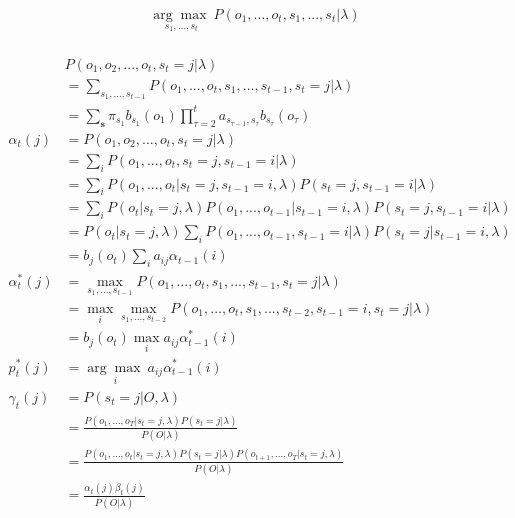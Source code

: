 \documentclass[11pt]{article}
\begin{document}
\begin{align*}
\underset{s_1, ..., s_t}{\arg\max\ } P(o_1, ..., o_t, s_1, ..., s_t | \lambda) \\
\end{align*}

\begin{align*}
& P(o_1, o_2, ..., o_t, s_t = j | \lambda) \\
&= \sum_{s_1, ..., s_{t-1}} P(o_1, ..., o_t, s_1, ..., s_{t-1}, s_t = j | \lambda) \\
&= \sum_\mathbf{s} \pi_{s_1} b_{s_1}(o_1) \prod_{\tau=2}^t a_{s_{\tau-1},s_\tau} b_{s_\tau}(o_\tau) \\
\alpha_t(j)
&= P(o_1, o_2, ..., o_t, s_t=j | \lambda) \\
  &= \sum_i P(o_1, ..., o_t, s_t=j, s_{t-1}=i | \lambda) \\
  &= \sum_i P(o_1, ..., o_t | s_t=j, s_{t-1}=i, \lambda) P(s_t=j, s_{t-1}=i | \lambda) \\
  &= \sum_i P(o_t | s_t=j, \lambda) P(o_1, ..., o_{t-1} | s_{t-1}=i, \lambda) P(s_t=j, s_{t-1}=i | \lambda) \\
  &= P(o_t | s_t=j, \lambda) \sum_i P(o_1, ..., o_{t-1}, s_{t-1}=i | \lambda) P(s_t=j | s_{t-1}=i, \lambda) \\
  &= b_j(o_t) \sum_i a_{ij} \alpha_{t-1}(i) \\
\alpha^*_t(j)
&= \max_{s_1, ..., s_{t-1}} P(o_1, ..., o_t, s_1, ..., s_{t-1}, s_t=j | \lambda) \\
&= \max_i \max_{s_1, ..., s_{t-2}} P(o_1, ..., o_t, s_1, ..., s_{t-2}, s_{t-1}=i, s_t=j | \lambda) \\
&= b_j(o_t) \max_i a_{ij} \alpha^*_{t-1}(i) \\
p^*_t(j)
&= \underset{i}{\arg\max\ } a_{ij} \alpha^*_{t-1}(i) \\
\gamma_t(j)
  &= P(s_t=j | O, \lambda) \\
  &= \frac{P(o_1, ..., o_T | s_t=j, \lambda) P(s_t=j | \lambda)}{P(O | \lambda)} \\
  &= \frac{P(o_1, ..., o_t | s_t=j, \lambda) P(s_t=j | \lambda) P(o_{t+1}, ..., o_T | s_t=j, \lambda)}{P(O | \lambda)} \\
  &= \frac{\alpha_t(j) \beta_t(j)}{P(O | \lambda)}
\end{align*}
\end{document}
